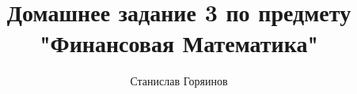 

\date{}
\title{Домашнее задание 3 по предмету "Финансовая Математика"}
\author{Станислав Горяинов}


\maketitle




